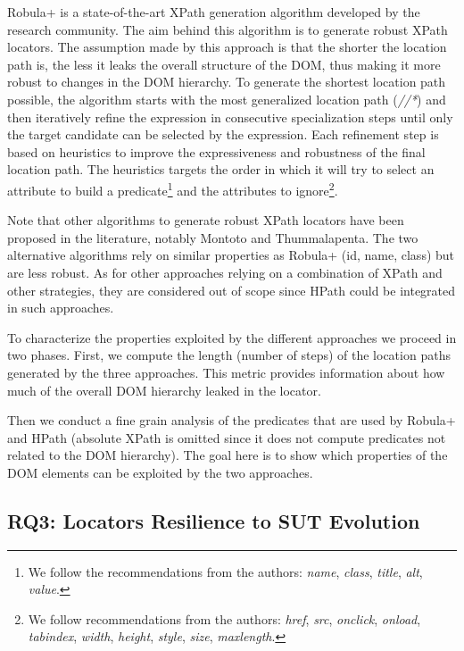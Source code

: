 Robula+\cite{Leotta2016} is a state-of-the-art XPath generation algorithm developed by the research community. The aim behind this algorithm is to generate robust XPath locators. The assumption made by this approach is that the shorter the location path is, the less it leaks the overall structure of the DOM, thus making it more robust to changes in the DOM hierarchy. To generate the shortest location path possible, the algorithm starts with the most generalized location path (\emph{//*}) and then iteratively refine the expression in consecutive specialization steps until only the target candidate can be selected by the expression. Each refinement step is based on heuristics to improve the expressiveness and robustness of the final location path. The heuristics targets the order in which it will try to select an attribute to build a predicate\footnote{We follow the recommendations from the authors: \emph{name}, \emph{class}, \emph{title}, \emph{alt}, \emph{value}.} and the attributes to ignore\footnote{We follow recommendations from the authors: \emph{href}, \emph{src}, \emph{onclick}, \emph{onload}, \emph{tabindex}, \emph{width}, \emph{height}, \emph{style}, \emph{size}, \emph{maxlength}.}.

Note that other algorithms to generate robust XPath locators have been proposed in the literature, notably Montoto\etal\cite{Montoto2011} and Thummalapenta\etal\cite{Thummalapenta2013}. The two alternative algorithms rely on similar properties as Robula+ (id, name, class) but are less robust\cite{Leotta2016}. As for other approaches relying on a combination of XPath and other strategies\cite{Leotta2015, Aldalur2017}, they are considered out of scope since HPath could be integrated in such approaches.

To characterize the properties exploited by the different approaches we proceed in two phases. First, we compute the length (number of steps) of the location paths generated by the three approaches. This metric provides information about how much of the overall DOM hierarchy leaked in the locator.

Then we conduct a fine grain analysis of the predicates that are used by Robula+ and HPath (absolute XPath is omitted since it does not compute predicates not related to the DOM hierarchy). The goal here is to show which properties of the DOM elements can be exploited by the two approaches.

\subsection{RQ3: Locators Resilience to SUT Evolution}
\label{sec:hpath-protocol-rq3}

